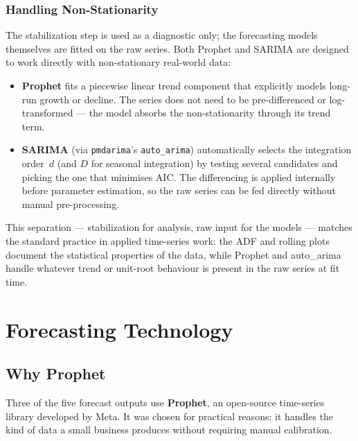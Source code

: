 \subsubsection*{Handling Non-Stationarity}

The stabilization step is used as a diagnostic only; the forecasting models
themselves are fitted on the raw series. Both Prophet and SARIMA are designed
to work directly with non-stationary real-world data:

\begin{itemize}
  \item \textbf{Prophet} fits a piecewise linear trend component that explicitly models
        long-run growth or decline. The series does not need to be pre-differenced or
        log-transformed --- the model absorbs the non-stationarity through its
        trend term.
  \item \textbf{SARIMA} (via \texttt{pmdarima}'s \texttt{auto\_arima}) automatically
        selects the integration order~$d$ (and $D$ for seasonal integration) by testing
        several candidates and picking the one that minimises AIC. The differencing is
        applied internally before parameter estimation, so the raw series can be fed
        directly without manual pre-processing.
\end{itemize}

This separation --- stabilization for analysis, raw input for the models ---
matches the standard practice in applied time-series work: the ADF and rolling
plots document the statistical properties of the data, while Prophet and
auto\_arima handle whatever trend or unit-root behaviour is present in the raw
series at fit time.

\section{Forecasting Technology}

\subsection{Why Prophet}

Three of the five forecast outputs use \textbf{Prophet}, an open-source time-series
library developed by Meta. It was chosen for practical reasons: it handles the kind of
data a small business produces without requiring manual calibration.

